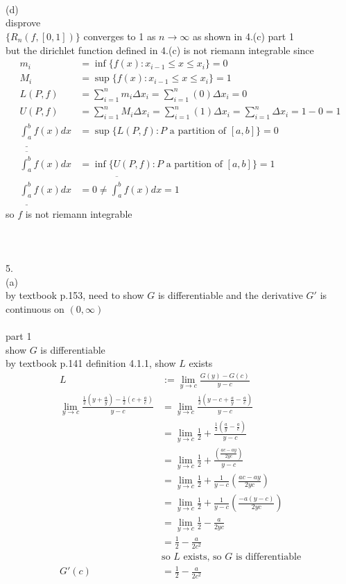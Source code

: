 \documentclass[12pt, border = 4pt, multi]{article} %
\begin{document}
\\
\\
\\
(d)\\
disprove\\
$\{R_n(f, [0, 1])\}$ converges to 1 as $n \rightarrow \infty$ as shown in 4.(c) part 1\\
but the dirichlet function defined in 4.(c) is not riemann integrable since
\begin{align*}
m_i &= \inf\{f(x): x_{i - 1} \leq x \leq x_i\} = 0\\
M_i &= \sup\{f(x): x_{i - 1} \leq x \leq x_i\} = 1\\
L(P, f) &= \sum_{i = 1} ^ n m_i \Delta x_i = \sum_{i = 1} ^ n (0)\Delta x_i = 0\\
U(P, f) &= \sum_{i = 1} ^ n M_i \Delta x_i = \sum_{i = 1} ^ n (1)\Delta x_i = \sum_{i = 1} ^ n \Delta x_i = 1 - 0 = 1\\
\underline{\int_a ^ b}f(x)dx &= \sup\{L(P, f): P \text{ a partition of }[a, b]\} = 0\\
\overline{\int_a ^ b}f(x)dx &= \inf\{U(P, f): P \text{ a partition of }[a, b]\} = 1\\
\underline{\int_a ^ b}f(x)dx &= 0 \not= \overline{\int_a ^ b}f(x)dx = 1
\end{align*}
so $f$ is not riemann integrable\\
\\
\\
\\
5.\\
(a)\\
by textbook p.153, need to show $G$ is differentiable and the derivative $G'$ is continuous on $(0, \infty)$\\
\\
part 1\\
show $G$ is differentiable\\
by textbook p.141 definition 4.1.1, show $L$ exists
\begin{align*}
L &:= \lim_{y \rightarrow c} \frac{G(y) - G(c)}{y - c}\\
\lim_{y \rightarrow c} \frac{\frac{1}{2}\left(y + \frac{a}{y}\right) - \frac{1}{2}\left(c + \frac{a}{c}\right)}{y - c} &= \lim_{y \rightarrow c} \frac{\frac{1}{2}\left(y - c + \frac{a}{y} - \frac{a}{c}\right)}{y - c}\\
&= \lim_{y \rightarrow c}\frac{1}{2} + \frac{\frac{1}{2}\left(\frac{a}{y} - \frac{a}{c}\right)}{y - c}\\
&= \lim_{y \rightarrow c}\frac{1}{2} + \frac{\left(\frac{ac - ay}{2yc}\right)}{y - c}\\
&= \lim_{y \rightarrow c}\frac{1}{2} + \frac{1}{y - c}\left(\frac{ac - ay}{2yc}\right)\\
&= \lim_{y \rightarrow c}\frac{1}{2} + \frac{1}{y - c}\left(\frac{-a(y - c)}{2yc}\right)\\
&= \lim_{y \rightarrow c}\frac{1}{2} - \frac{a}{2yc}\\
&= \frac{1}{2} - \frac{a}{2c ^ 2}\\
&\text{so $L$ exists, so $G$ is differentiable}\\
G'(c) &= \frac{1}{2} - \frac{a}{2c ^ 2}\\
\end{align*}
\end{document}
